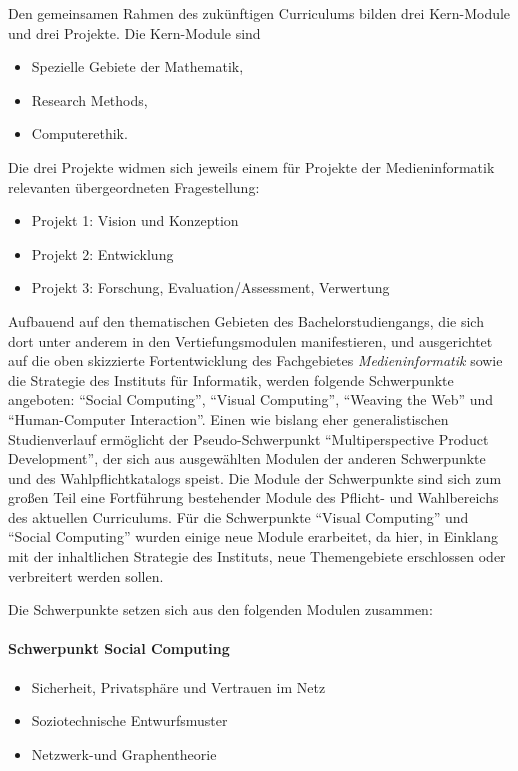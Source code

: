 Den gemeinsamen Rahmen des zukünftigen Curriculums bilden drei
Kern-Module und drei Projekte. Die Kern-Module sind

\begin{itemize}
\tightlist
\item
  Spezielle Gebiete der Mathematik,
\item
  Research Methods,
\item
  Computerethik.
\end{itemize}

Die drei Projekte widmen sich jeweils einem für Projekte der
Medieninformatik relevanten übergeordneten Fragestellung:

\begin{itemize}
\tightlist
\item
  Projekt 1: Vision und Konzeption
\item
  Projekt 2: Entwicklung
\item
  Projekt 3: Forschung, Evaluation/Assessment, Verwertung
\end{itemize}

Aufbauend auf den thematischen Gebieten des Bachelorstudiengangs, die
sich dort unter anderem in den Vertiefungsmodulen manifestieren, und
ausgerichtet auf die oben skizzierte Fortentwicklung des Fachgebietes
\emph{Medieninformatik} sowie die Strategie des Instituts für
Informatik, werden folgende Schwerpunkte angeboten: ``Social
Computing'', ``Visual Computing'', ``Weaving the Web'' und
``Human-Computer Interaction''. Einen wie bislang eher generalistischen
Studienverlauf ermöglicht der Pseudo-Schwerpunkt ``Multiperspective
Product Development'', der sich aus ausgewählten Modulen der anderen
Schwerpunkte und des Wahlpflichtkatalogs speist. Die Module der
Schwerpunkte sind sich zum großen Teil eine Fortführung bestehender
Module des Pflicht- und Wahlbereichs des aktuellen Curriculums. Für die
Schwerpunkte ``Visual Computing'' und ``Social Computing'' wurden einige
neue Module erarbeitet, da hier, in Einklang mit der inhaltlichen
Strategie des Instituts, neue Themengebiete erschlossen oder verbreitert
werden sollen.

Die Schwerpunkte setzen sich aus den folgenden Modulen zusammen:

\paragraph{Schwerpunkt Social
Computing}\label{schwerpunkt-social-computing}

\begin{itemize}
\tightlist
\item
  Sicherheit, Privatsphäre und Vertrauen im Netz
\item
  Soziotechnische Entwurfsmuster
\item
  Netzwerk-und Graphentheorie
\end{itemize}

